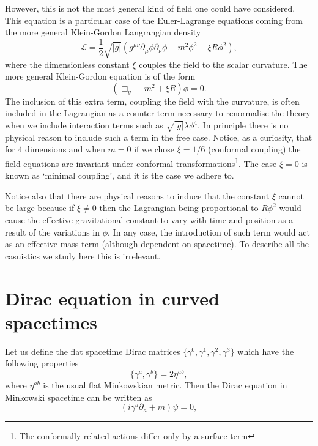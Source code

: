 However, this is not the most general kind of field one could have considered. This equation is a particular case of the Euler-Lagrange equations coming from the more general Klein-Gordon Langrangian density 
\begin{equation}
\mathcal{L}=\frac12\sqrt{\left|g\right|}\left(g^{\mu\nu}\partial_\mu\phi \partial_\nu \phi +m^2\phi^2-\xi R\phi^2\right),
\end{equation}
where the dimensionless constant $\xi$ couples the field to the scalar curvature. The more general Klein-Gordon equation is of the form 
\begin{equation}
(\Box_g-m^2+\xi R) \phi =0.
\end{equation}
The inclusion of this extra term, coupling the field with the curvature, is often included in the Lagrangian as a counter-term necessary to renormalise the theory when we include interaction terms such as $\sqrt{|g|}\lambda\phi^4$. In principle there is no physical reason to include such a term in the free case. Notice, as a curiosity, that for 4 dimensions and when $m=0$ if we chose $\xi=1/6$ (conformal coupling) the field equations are invariant under conformal transformations\footnote{The conformally related actions differ only by a surface term}. The case $\xi=0$ is known as `minimal coupling', and it is the case we adhere to. 

Notice also that there are physical reasons to induce that the constant $\xi$ cannot be large because if $\xi\neq0$ then the Lagrangian being proportional to $R\phi^2$  would cause the effective gravitational constant to vary with time and position as a result of the variations in $\phi$. In any case, the introduction of such term would act as an effective mass term (although dependent on spacetime). To describe all the casuistics we study here this is irrelevant.

\section{Dirac equation in curved spacetimes}

Let us define the flat spacetime Dirac matrices $\{\gamma^0,\gamma^1,\gamma^2,\gamma^3\}$
which have the following properties
\begin{equation}
\{\gamma^a,\gamma^b\}=2\eta^{ab},
\end{equation}
where $\eta^{ab}$ is the usual flat Minkowskian metric. Then the Dirac equation in Minkowski spacetime can be written as
\begin{equation}\label{Dirac3}
(i\gamma^{a}\partial_{a}+m)\psi=0,
\end{equation}

